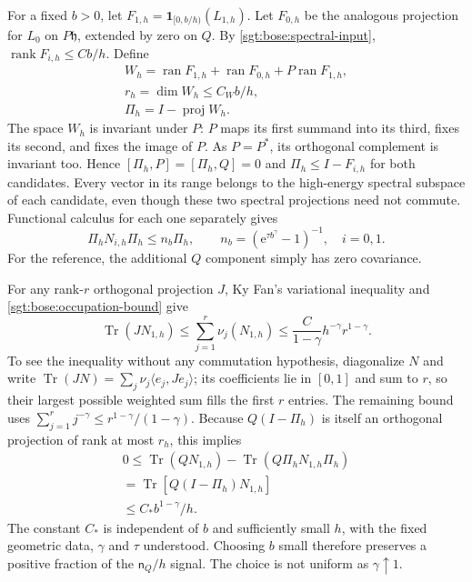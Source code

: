 \documentclass[aps,pra,reprint,superscriptaddress,longbibliography]{revtex4-2}
\newcommand{\Tr}{\operatorname{Tr}}
\newcommand{\ee}{\mathrm e}
\newcommand{\one}{\mathbf 1}
\begin{document}
For a fixed $b>0$, let
$F_{1,h}=\one_{[0,b/h)}(L_{1,h})$.  Let $F_{0,h}$ be the analogous
projection for $L_0$ on $P\mathfrak h$, extended by zero on $Q$.
By \eqref{sgt:bose:spectral-input},
$\operatorname{rank}F_{i,h}\le Cb/h$.  Define
\begin{equation}
\begin{gathered}
 W_h=\operatorname{ran}F_{1,h}+\operatorname{ran}F_{0,h}
                          +P\operatorname{ran}F_{1,h},
 \\
 r_h=\dim W_h\le C_Wb/h,
 \\
\Pi_h=I-\operatorname{proj}W_h.
 \label{sgt:bose:rejected-space}
\end{gathered}
\end{equation}
The space $W_h$ is invariant under $P$: $P$ maps its first summand
into its third, fixes its second, and fixes the image of $P$.
As $P=P^*$, its orthogonal complement is invariant too.  Hence
$[\Pi_h,P]=[\Pi_h,Q]=0$ and $\Pi_h\le I-F_{i,h}$ for both candidates.
Every vector in its range belongs to the high-energy spectral subspace
of each candidate, even though these two spectral projections need
not commute.  Functional calculus for each one separately gives
\begin{equation}
 \Pi_hN_{i,h}\Pi_h\le n_b\Pi_h,
 \qquad n_b=(\ee^{\tau b^\gamma}-1)^{-1},\quad i=0,1.
 \label{sgt:bose:bounded-filter-covariance}
\end{equation}
For the reference, the additional $Q$ component simply has zero
covariance.

For any rank-$r$ orthogonal projection $J$, Ky Fan's variational
inequality and \eqref{sgt:bose:occupation-bound} give
\begin{equation}
 \Tr(JN_{1,h})\le\sum_{j=1}^r\nu_j(N_{1,h})
   \le\frac{C}{1-\gamma}h^{-\gamma}r^{1-\gamma}.
 \label{sgt:bose:ky-fan}
\end{equation}
To see the inequality without any commutation hypothesis, diagonalize
$N$ and write $\Tr(JN)=\sum_j\nu_j\langle e_j,Je_j\rangle$; its
coefficients lie in $[0,1]$ and sum to $r$, so their largest possible
weighted sum fills the first $r$ entries.  The remaining bound uses
$\sum_{j=1}^rj^{-\gamma}\le r^{1-\gamma}/(1-\gamma)$.
Because $Q(I-\Pi_h)$ is itself an orthogonal projection of rank at
most $r_h$, this implies
\begin{equation}
\begin{gathered}
 0\le\Tr(QN_{1,h})-\Tr(Q\Pi_hN_{1,h}\Pi_h)
\\
   =\Tr[Q(I-\Pi_h)N_{1,h}]
\\
   \le C_*b^{1-\gamma}/h.
 \label{sgt:bose:filter-loss}
\end{gathered}
\end{equation}
The constant $C_*$ is independent of $b$ and sufficiently small $h$,
with the fixed geometric data, $\gamma$ and $\tau$ understood.
Choosing $b$ small therefore preserves a positive fraction of the
$\mathsf n_Q/h$ signal.  The choice is not uniform as $\gamma\uparrow1$.
\end{document}

